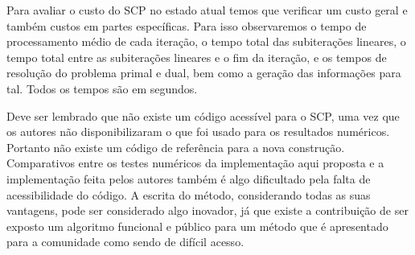 \noindent
Para avaliar o custo do SCP no estado atual temos que verificar um custo geral
e também custos em partes específicas. Para isso observaremos o tempo
de processamento médio de cada iteração, o tempo total das subiterações lineares,
o tempo total entre as subiterações lineares e o fim da iteração, e os tempos
de resolução do problema primal e dual, bem como a geração das informações para tal.
Todos os tempos são em segundos. %

Deve ser lembrado que não existe um código acessível para o SCP, uma vez que os
autores não disponibilizaram o que foi usado para os resultados numéricos. Portanto
não existe um código de referência para a nova construção. Comparativos entre os
testes numéricos da implementação aqui proposta e a implementação feita pelos autores
também é algo dificultado pela falta de acessibilidade do código. A escrita do método,
considerando todas as suas vantagens, pode ser considerado algo inovador, já que
existe a contribuição de ser exposto um algoritmo funcional e público para um
método que é apresentado para a comunidade como sendo de difícil acesso.






